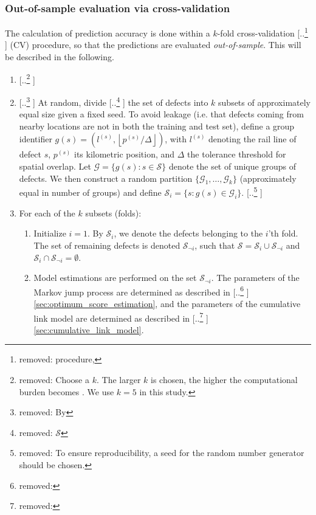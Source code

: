 \documentclass{article}
\providecommand{\DIFadd}[1]{{\protect\color{blue} \sf #1}} %
\providecommand{\DIFdel}[1]{{\protect\color{red} [..\footnote{removed: #1} ]}} %
\providecommand{\DIFaddbegin}{} %
\providecommand{\DIFaddend}{} %
\providecommand{\DIFdelbegin}{} %
\providecommand{\DIFdelend}{} %
\begin{document}
\subsubsection{\DIFadd{Out-of-sample evaluation via cross-validation}} \label{sec:CV}
\DIFadd{The calculation of prediction accuracy is done within }\DIFaddend a $k$-fold cross-validation \DIFdelbegin \DIFdel{procedure, }\DIFdelend \DIFaddbegin \DIFadd{(CV) procedure, so that the predictions are evaluated \textit{out-of-sample}. This will be }\DIFaddend described in the following.

\begin{enumerate}
    \item \DIFdelbegin \DIFdel{Choose a $k$. The larger $k$ is chosen, the higher the computational burden becomes \citep{fushiki2011a}. We use $k = 5$ in this study.
    }%
\item%
\DIFdel{By }\DIFdelend \DIFaddbegin \DIFadd{At }\DIFaddend random, divide \DIFdelbegin \DIFdel{$\mathcal{S}$ }\DIFdelend \DIFaddbegin \DIFadd{the set of defects }\DIFaddend into $k$ subsets of approximately equal size \DIFaddbegin \DIFadd{given a fixed seed. To avoid leakage (i.e. that defects coming from nearby locations are not in both the training and test set), define a group identifier $g(s) = (l^{(s)},\left \lfloor{p^{(s)}/\Delta}\right \rfloor )$, with $l^{(s)}$ denoting the rail line of defect $s$, $p^{(s)}$ its kilometric position, and $\Delta$ the tolerance threshold for spatial overlap. Let $\mathcal{G} = \{g(s) : s \in \mathcal S\}$ denote the set of unique groups of defects. We then construct a random partition $\{\mathcal{G}_1, \dots, \mathcal{G}_k\}$ (approximately equal in number of groups) and define $\mathcal S_i = \{s : g(s) \in \mathcal G_i\}$}\DIFaddend . 
    \DIFdelbegin \DIFdel{To ensure reproducibility, a seed for the random number generator should be chosen.
    }\DIFdelend \item For each of the $k$ subsets (folds):
    \begin{enumerate}
        \item Initialize $i = 1$. By $\mathcal{S}_i$, we denote the defects belonging to the $i$'th fold. The set of remaining defects is denoted $\mathcal{S}_{\neg i}$, such that $\mathcal{S} = \mathcal{S}_i \cup \mathcal{S}_{\neg i}$ and $\mathcal{S}_i \cap \mathcal{S}_{\neg i} = \emptyset$.
        \item Model estimations are performed on the set $\mathcal{S}_{\neg i}$. The parameters of the Markov jump process are determined as described in \DIFdelbegin \DIFdel{}\DIFdelend \DIFaddbegin \DIFadd{\cref{sec:optimum_score_estimation}}\DIFaddend , and the parameters of the cumulative link model are determined as described in \DIFdelbegin \DIFdel{}\DIFdelend \DIFaddbegin \DIFadd{\cref{sec:cumulative_link_model}}\DIFaddend .

\end{enumerate}
\end{enumerate}
\end{document}
